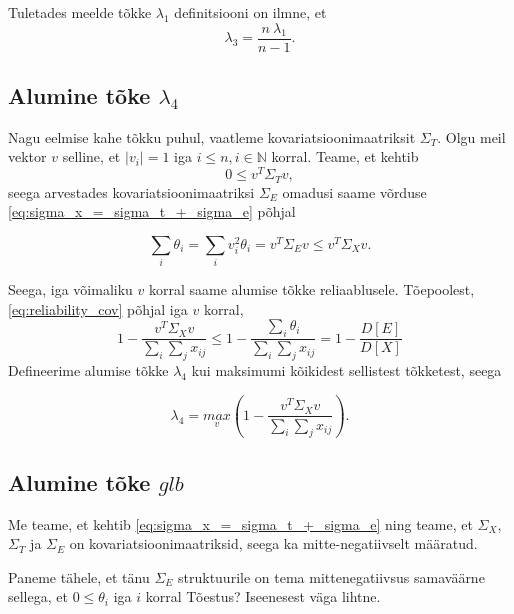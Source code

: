 \documentclass[a4paper,12pt]{article}
\numberwithin{equation}{section}
\theoremstyle{definition}
\begin{document}
Tuletades meelde tõkke $\lambda_1$ definitsiooni on ilmne, et
\begin{equation}
\label{eq:lambda_3_from_lambda_1}
\lambda_3 = \frac{n\ \lambda_1}{n-1}.
\end{equation}
 

 
\subsection{Alumine tõke $\lambda_4$}

Nagu eelmise kahe tõkku puhul, vaatleme kovariatsioonimaatriksit $\Sigma_T$. Olgu meil vektor $v$ selline, et $\lvert {v_i} \rvert = 1$ iga $i \leq n, i \in \mathbb{N}$ korral.    
Teame, et kehtib
\begin{equation*}
0 \leq v^{T} \Sigma_T v,
\end{equation*}
seega arvestades kovariatsioonimaatriksi $\Sigma_E$ omadusi saame võrduse \eqref{eq:sigma_x_=_sigma_t_+_sigma_e} põhjal 

\begin{equation*}
\sum_i \theta_i = \sum_i v_{i}^{2} \theta_i = v^{T} \Sigma_E v \leq v^{T} \Sigma_X v.
\end{equation*}

Seega, iga võimaliku $v$ korral saame alumise tõkke reliaablusele. Tõepoolest, \eqref{eq:reliability_cov} põhjal iga $v$ korral,  
\begin{equation*}
1 - \frac{v^T \Sigma_X v}{\sum_i \sum_j x_{ij}} \leq 1 - \frac{\sum_i \theta_i}{\sum_i \sum_j x_{ij}} = 1 - \frac{D \left[ E \right]}{ D \left[X \right]  }
\end{equation*} 
Defineerime alumise tõkke $\lambda_4$ kui maksimumi kõikidest sellistest tõkketest, seega

\begin{equation*}
\lambda_4  = \underset{v}{max} \left( 1 - \frac{v^{T} \Sigma_X v}{\sum_i \sum_j x_{ij}} \right).
\end{equation*}


\subsection{Alumine tõke $glb$}

Me teame, et kehtib \eqref{eq:sigma_x_=_sigma_t_+_sigma_e} ning teame, et $\Sigma_X$, $\Sigma_T$ ja $\Sigma_E$ on kovariatsioonimaatriksid, seega ka mitte-negatiivselt määratud.

Paneme tähele, et tänu $\Sigma_E$ struktuurile on tema mittenegatiivsus samaväärne sellega, et $0 \leq \theta_i$ iga $i$ korral {\color{cyan} Tõestus? Iseenesest väga lihtne}. 
\end{document}
